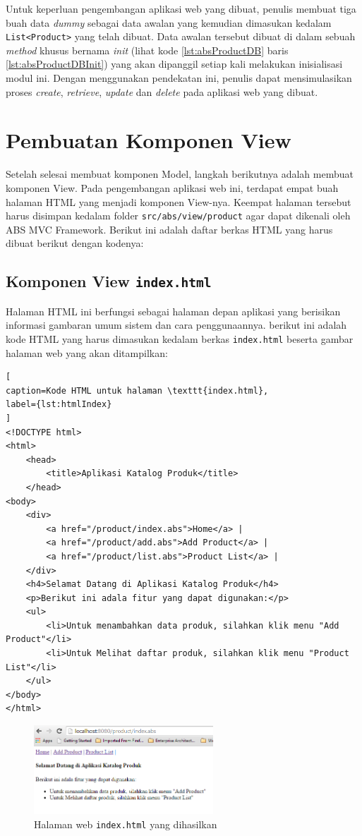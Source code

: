 Untuk keperluan pengembangan aplikasi web yang dibuat, penulis membuat tiga buah data \textit{dummy} sebagai data awalan yang kemudian dimasukan kedalam \texttt{List<Product>} yang telah dibuat. Data awalan tersebut dibuat di dalam sebuah \textit{method} khusus bernama \textit{init} (lihat kode \ref{lst:absProductDB} baris \ref{lst:absProductDBInit}) yang akan dipanggil setiap kali melakukan inisialisasi modul ini. Dengan menggunakan pendekatan ini, penulis dapat mensimulasikan proses \textit{create}, \textit{retrieve}, \textit{update} dan \textit{delete} pada aplikasi web yang dibuat.

\section{Pembuatan Komponen View}

Setelah selesai membuat komponen Model, langkah berikutnya adalah membuat komponen View. Pada pengembangan aplikasi web ini, terdapat empat buah halaman HTML yang menjadi komponen View-nya. Keempat halaman tersebut harus disimpan kedalam folder \texttt{src/abs/view/product} agar dapat dikenali oleh ABS MVC Framework. Berikut ini adalah daftar berkas HTML yang harus dibuat berikut dengan kodenya:

\subsection{Komponen View \texttt{index.html}}
Halaman HTML ini berfungsi sebagai halaman depan aplikasi yang berisikan informasi gambaran umum sistem dan cara penggunaannya. berikut ini adalah kode HTML yang harus dimasukan kedalam berkas \texttt{index.html} beserta gambar halaman web yang akan ditampilkan:

\begin{lstlisting}[
caption=Kode HTML untuk halaman \texttt{index.html},
label={lst:htmlIndex}
]
<!DOCTYPE html>
<html>
	<head>
		<title>Aplikasi Katalog Produk</title>
	</head>
<body>
	<div>
		<a href="/product/index.abs">Home</a> |
		<a href="/product/add.abs">Add Product</a> |
		<a href="/product/list.abs">Product List</a> |
	</div>
	<h4>Selamat Datang di Aplikasi Katalog Produk</h4>
	<p>Berikut ini adala fitur yang dapat digunakan:</p>
	<ul>
		<li>Untuk menambahkan data produk, silahkan klik menu "Add Product"</li>
		<li>Untuk Melihat daftar produk, silahkan klik menu "Product List"</li>
	</ul>
</body>
</html>
\end{lstlisting}

\begin{figure}
    \centering
    \includegraphics[width=0.6\textwidth]{img/hasil-index.png}
    \caption{Halaman web \texttt{index.html} yang dihasilkan}
    \label{fig:htmlIndex}
\end{figure}

